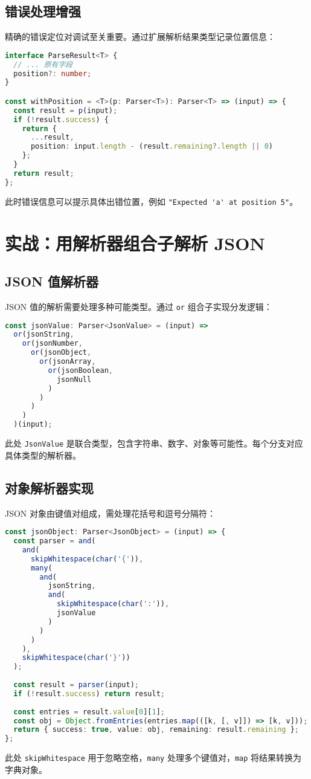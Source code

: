 \section{错误处理增强}
精确的错误定位对调试至关重要。通过扩展解析结果类型记录位置信息：\par
\begin{lstlisting}[language=typescript]
interface ParseResult<T> {
  // ... 原有字段
  position?: number;
}

const withPosition = <T>(p: Parser<T>): Parser<T> => (input) => {
  const result = p(input);
  if (!result.success) {
    return {
      ...result,
      position: input.length - (result.remaining?.length || 0)
    };
  }
  return result;
};
\end{lstlisting}
此时错误信息可以提示具体出错位置，例如 \verb!"Expected 'a' at position 5"!。\par
\chapter{实战：用解析器组合子解析 JSON}
\section{JSON 值解析器}
JSON 值的解析需要处理多种可能类型。通过 \verb!or! 组合子实现分发逻辑：\par
\begin{lstlisting}[language=typescript]
const jsonValue: Parser<JsonValue> = (input) =>
  or(jsonString,
    or(jsonNumber,
      or(jsonObject,
        or(jsonArray,
          or(jsonBoolean,
            jsonNull
          )
        )
      )
    )
  )(input);
\end{lstlisting}
此处 \verb!JsonValue! 是联合类型，包含字符串、数字、对象等可能性。每个分支对应具体类型的解析器。\par
\section{对象解析器实现}
JSON 对象由键值对组成，需处理花括号和逗号分隔符：\par
\begin{lstlisting}[language=typescript]
const jsonObject: Parser<JsonObject> = (input) => {
  const parser = and(
    and(
      skipWhitespace(char('{')),
      many(
        and(
          jsonString,
          and(
            skipWhitespace(char(':')),
            jsonValue
          )
        )
      )
    ),
    skipWhitespace(char('}'))
  );
  
  const result = parser(input);
  if (!result.success) return result;
  
  const entries = result.value[0][1];
  const obj = Object.fromEntries(entries.map(([k, [, v]]) => [k, v]));
  return { success: true, value: obj, remaining: result.remaining };
};
\end{lstlisting}
此处 \verb!skipWhitespace! 用于忽略空格，\verb!many! 处理多个键值对，\verb!map! 将结果转换为字典对象。\par
